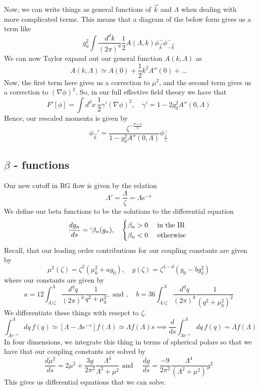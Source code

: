  
Now, we can write things as general functions of $ \vec{k}  $ and $\Lambda $
when dealing with more complicated terms. 
This means that a diagram of the below form gives us a term like 
\[
	g_0 ^ 2 \int \frac{ d ^ d k }{ ( 2 \pi ) ^ d } \frac{1}{2 } A( \Lambda , k) \phi_{\vec{k} } ^ - 
	\phi _{  - \vec{k} } ^ -  
\] We can now Taylor expand out our general function 
$ A ( k, \Lambda ) $ as 
 \[
	 A ( k , \Lambda ) \simeq A ( 0 ) + \frac{1}{2 } k ^ 2 A'' ( 0 ) + \dots
 \] Now, the first term here
 gives us a correction to $\mu ^ 2  $, and the second term 
 gives us a correction to $ ( \nabla \phi ) ^ 2 $. 
 So, in our full effective field theory we have that 
 \[
	 F ' [ \phi ] = \int d^ d x \, \frac{1}{2 } \gamma ' ( \nabla \phi ) ^ 2, 
	 \quad \gamma ' =  1- 2 g_0 ^ 2 A'' ( 0 , \Lambda ) 
 \] Hence, our rescaled momenta is given by 
 \[
	 \phi_{ \vec{k} } ' = \frac{ \zeta ^{  - \frac{ d + 2 }{ 2 } } }{1 - g_0 ^ 2 A'' ( 0 
	 , \Lambda ) } \phi_{ \frac{ \vec{k} }{ \zeta } } ^ - 
 \]
 \subsection{$ \beta$ - functions}
 Our new cutoff in RG flow is given by the relation 
\[
 \Lambda ' = \frac{ \Lambda }{ \zeta  } = \Lambda e^{ - s }
\] We define our beta functions to be the 
solutions to the differential equation 
\[
	\frac{ d g_ n }{ ds } = `\beta_ n ( g _ n ) , \quad \begin{cases}
		\beta_ n > 0 & \text{ in the IR } \\
		\beta _ n < 0 & \text{ otherwise }
	\end{cases}
\] Recall, that our leading order 
contributions for our coupling constants are given by 
\[
 \mu ^ 2 ( \zeta ) = \zeta ^ 2 ( \mu _ 0 ^ 2  + ag_0 ), \quad
 g ( \zeta ) = \zeta ^{ 4 - d  } ( g_0 - b g_0^ 2 ) 
\] where our constants are given by 
\[
	a = 12 \int_{ \Lambda / \zeta } ^ \Lambda \frac{  d^ d q }{ ( 2 \pi ) ^ d }
	\frac{1}{q ^ 2 + \mu _ 0 ^ 2}, \text{ and } , \quad
	b = 36 \int _{ \Lambda / \zeta } ^  \Lambda \frac{ d ^ d q }{ 
	( 2 \pi ) ^ d  } \frac{1}{( q ^ 2 + \mu _ 0 ^ 2 ) ^ 2 }
\] We differentiate these things with resepct to $ \zeta $. 
\[
	\int _{ \Lambda e ^{ - s} } ^ \Lambda dq \, f ( q) 
	\simeq \left[  \Lambda - \Lambda e^{ - s}  \right] f ( \Lambda ) 
	\simeq \Lambda f ( \Lambda ) s \implies 
	\frac{ d }{ ds } \int _{ \Lambda e ^{ - s} } ^ \Lambda 
	dq \, f ( q ) = \Lambda f ( \Lambda ) 
\] In four dimensions, we integrate this 
thing in terms of spherical polars so that 
we have that our coupling constants are solved by 
\[
 \frac{d \mu ^ 2 }{ ds } = 2 \mu ^ 2 + \frac{ 3g }{ 2 \pi ^ 2 } 
 \frac{ \Lambda ^ 4 }{ \Lambda ^ 2 + \mu ^ 2  } \text{ and } \quad
 \frac{ dg }{ ds } = \frac{ - 9 }{ 2 \pi ^ 2 } \frac{ \Lambda ^ 4 }{
 ( \Lambda ^ 2 + \mu ^ 2 ) } g ^ 2  
\] This gives us differential equations that 
we can solve. 

